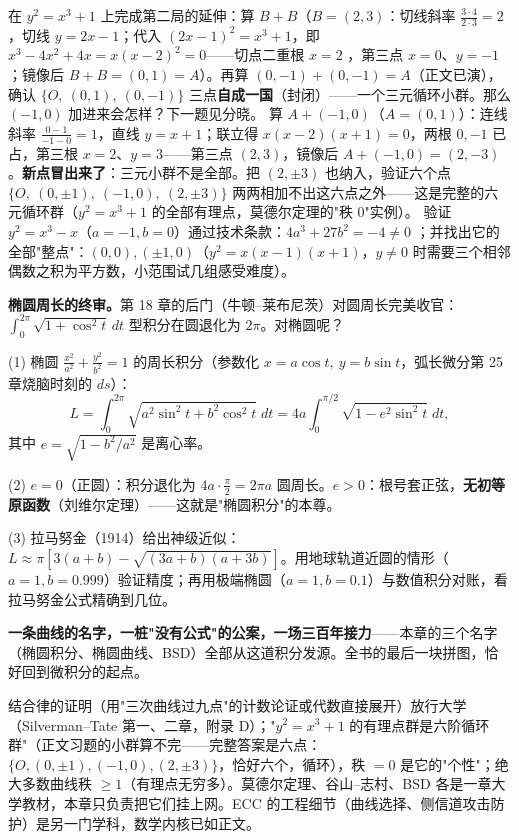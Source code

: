 \begin{dongshou}
\begin{itemize}
  \yisi 在 $y^2 = x^3 + 1$ 上完成第二局的延伸：算 $B + B$（$B = (2,3)$：切线斜率 $\tfrac{3\cdot4}{2\cdot3} = 2$，切线 $y = 2x - 1$；代入 $(2x-1)^2 = x^3 + 1$，即 $x^3 - 4x^2 + 4x = x(x-2)^2 = 0$——切点二重根 $x = 2$ \checkmark，第三点 $x = 0$、$y = -1$；镜像后 $B + B = (0, 1) = A$）。再算 $(0,-1) + (0,-1) = A$（正文已演），确认 $\{O,\ (0,1),\ (0,-1)\}$ 三点\textbf{自成一国}（封闭）——一个三元循环小群。那么 $(-1,0)$ 加进来会怎样？下一题见分晓。
  \yier 算 $A + (-1,0)$（$A = (0,1)$）：连线斜率 $\tfrac{0-1}{-1-0} = 1$，直线 $y = x+1$；联立得 $x(x-2)(x+1) = 0$，两根 $0, -1$ 已占，第三根 $x = 2$、$y = 3$——第三点 $(2,3)$，镜像后 $A + (-1,0) = (2, -3)$。\textbf{新点冒出来了}：三元小群不是全部。把 $(2, \pm3)$ 也纳入，验证六个点 $\{O,\ (0,\pm1),\ (-1,0),\ (2,\pm3)\}$ 两两相加不出这六点之外——这是完整的六元循环群（$y^2 = x^3+1$ 的全部有理点，莫德尔定理的"秩 $0$"实例）。
  \yier 验证 $y^2 = x^3 - x$（$a = -1, b = 0$）通过技术条款：$4a^3 + 27b^2 = -4 \ne 0$ \checkmark；并找出它的全部"整点"：$(0, 0), (\pm1, 0)$（$y^2 = x(x-1)(x+1)$，$y \ne 0$ 时需要三个相邻偶数之积为平方数，小范围试几组感受难度）。
\end{itemize}
\end{dongshou}

\begin{shaonao}
\textbf{椭圆周长的终审。}第 18 章的后门（牛顿--莱布尼茨）对圆周长完美收官：$\int_0^{2\pi}\sqrt{1 + \cos^2t}\,dt$ 型积分在圆退化为 $2\pi$。对椭圆呢？

(1) 椭圆 $\tfrac{x^2}{a^2} + \tfrac{y^2}{b^2} = 1$ 的周长积分（参数化 $x = a\cos t,\ y = b\sin t$，弧长微分第 25 章烧脑时刻的 $ds$）：
\[
L = \int_0^{2\pi}\sqrt{a^2\sin^2t + b^2\cos^2t}\;dt = 4a\int_0^{\pi/2}\sqrt{1 - e^2\sin^2 t}\;dt ,
\]
其中 $e = \sqrt{1 - b^2/a^2}$ 是离心率。

(2) $e = 0$（正圆）：积分退化为 $4a\cdot\tfrac\pi2 = 2\pi a$ \checkmark 圆周长。$e > 0$：根号套正弦，\textbf{无初等原函数}（刘维尔定理）——这就是"椭圆积分"的本尊。

(3) 拉马努金（1914）给出神级近似：$L \approx \pi\left[3(a+b) - \sqrt{(3a+b)(a+3b)}\right]$。用地球轨道近圆的情形（$a = 1, b = 0.999$）验证精度；再用极端椭圆（$a = 1, b = 0.1$）与数值积分对账，看拉马努金公式精确到几位。

\textbf{一条曲线的名字，一桩"没有公式"的公案，一场三百年接力}——本章的三个名字（椭圆积分、椭圆曲线、BSD）全部从这道积分发源。全书的最后一块拼图，恰好回到微积分的起点。
\end{shaonao}

\begin{chengshi}
结合律的证明（用"三次曲线过九点"的计数论证或代数直接展开）放行大学（Silverman--Tate 第一、二章，附录 D）；"$y^2 = x^3+1$ 的有理点群是六阶循环群"（正文习题的小群算不完——完整答案是六点：$\{O, (0,\pm1), (-1,0), (2,\pm3)\}$，恰好六个，循环），秩 $= 0$ 是它的"个性"；绝大多数曲线秩 $\ge 1$（有理点无穷多）。莫德尔定理、谷山--志村、BSD 各是一章大学教材，本章只负责把它们挂上网。ECC 的工程细节（曲线选择、侧信道攻击防护）是另一门学科，数学内核已如正文。
\end{chengshi}
